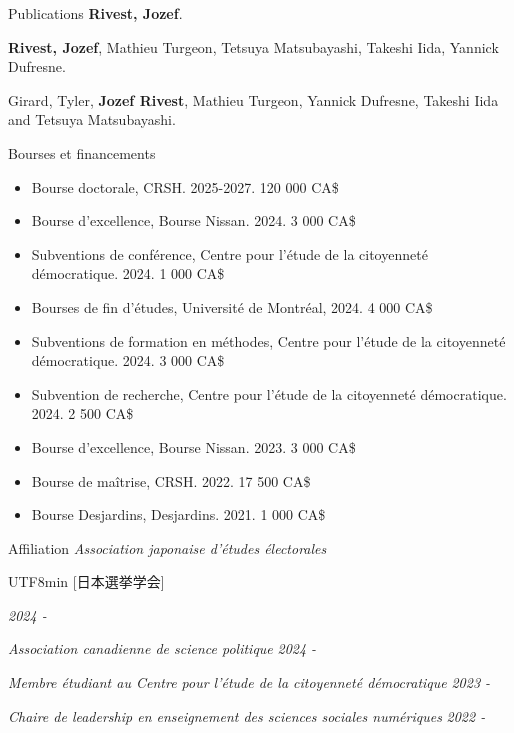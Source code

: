 \documentclass{resume} %
\begin{document}
\begin{rSection}{Publications}
{\textbf{Rivest, Jozef}. }

{\textbf{Rivest, Jozef}, Mathieu Turgeon, Tetsuya Matsubayashi, Takeshi Iida, Yannick Dufresne. }

{Girard, Tyler, \textbf{Jozef Rivest}, Mathieu Turgeon, Yannick Dufresne, Takeshi Iida and Tetsuya Matsubayashi. } \par 

\end{rSection}

\begin{rSection}{Bourses et financements}
\begin{itemize} 
  \item Bourse doctorale, CRSH. 2025-2027. 120 000 CA\$
  \item Bourse d'excellence, Bourse Nissan. 2024. 3 000 CA\$
  \item Subventions de conférence, Centre pour l'étude de la citoyenneté démocratique. 2024. 1 000 CA\$
  \item Bourses de fin d'études, Université de Montréal, 2024. 4 000 CA\$
  \item Subventions de formation en méthodes, Centre pour l'étude de la citoyenneté démocratique. 2024. 3 000 CA\$
  \item Subvention de recherche, Centre pour l'étude de la citoyenneté démocratique. 2024. 2 500 CA\$
  \item Bourse d'excellence, Bourse Nissan. 2023. 3 000 CA\$
  \item Bourse de maîtrise, CRSH. 2022. 17 500 CA\$
  \item Bourse Desjardins, Desjardins. 2021. 1 000 CA\$
\end{itemize}

\end{rSection}


\begin{rSection}{Affiliation} 
  {\em Association japonaise d'études électorales}\begin{CJK}{UTF8}{min} [日本選挙学会]\end{CJK} \hfill{\em 2024 - } \par
{\em Association canadienne de science politique} \hfill{\em 2024 - } \par
{\em Membre étudiant au Centre pour l'étude de la citoyenneté démocratique} \hfill{\em 2023 - } \par
{\em Chaire de leadership en enseignement des sciences sociales numériques} \hfill{\em 2022 - }

\end{rSection}
\end{document}
